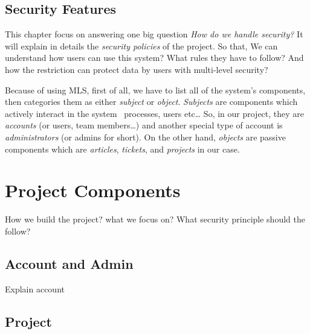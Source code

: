 
\subsection{Security Features}
\label{ch:hopot_project:concepts:security_features}

This chapter focus on answering one big question \emph{How do we handle security?}
It will explain in details the \emph{security policies} of the project.
So that, We can understand how users can use this system? What rules they have to follow? And how the restriction can protect data by users with multi-level security?

Because of using MLS, first of all, we have to list all of the system's components, then categories them as either \emph{subject} or \emph{object}.
\emph{Subjects} are components which actively interact in the system \eg\ processes, users etc\dots
So, in our project, they are \emph{accounts} (or users, team members\dots) and another special type of account is \emph{administrators} (or admins for short).
On the other hand, \emph{objects} are passive components which are \emph{articles}, \emph{tickets}, and \emph{projects} in our case.


\section{Project Components}
\label{ch:hopot_project:project_components}

How we build the project? what we focus on? What security principle should the follow?


\subsection{Account and Admin}
\label{ch:hopot_project:project_components:account}

Explain account


\subsection{Project}
\label{ch:hopot_project:project_components:project}

